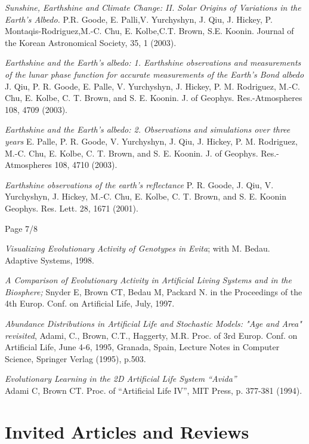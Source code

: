 \documentclass[margin,line]{resume}
\begin{document}
\begin{resume}
{\em Sunshine, Earthshine and Climate Change: II. Solar Origins of Variations in the Earth's Albedo.}  P.R. Goode, E. Palli,V. Yurchyshyn, J. Qiu,
 J. Hickey, P. Montaqis-Rodriguez,M.-C. Chu,
 E. Kolbe,C.T. Brown, S.E. Koonin.
Journal of the Korean Astronomical Society, 35, 1 (2003).

{\em Earthshine and the Earth's albedo: 1. Earthshine observations and measurements of the lunar phase function for accurate measurements of the Earth's Bond albedo}
J. Qiu, P. R. Goode, E. Palle, V. Yurchyshyn, J. Hickey, P. M. Rodriguez, M.-C. Chu, E. Kolbe, C. T. Brown, and S. E. Koonin.
J. of Geophys. Res.-Atmospheres 108, 4709 (2003).

{\em Earthshine and the Earth's albedo: 2. Observations and simulations over three years}
 E. Palle, P. R. Goode, V. Yurchyshyn, J. Qiu, J. Hickey, P. M. Rodriguez, M.-C. Chu, E. Kolbe, C. T. Brown, and S. E. Koonin.
J. of Geophys. Res.-Atmospheres 108, 4710 (2003).


{\em Earthshine observations of the earth's reflectance}
P. R. Goode, J. Qiu, V. Yurchyshyn, J. Hickey, M.-C. Chu, E. Kolbe, C. T. Brown, and S. E. Koonin
Geophys. Res. Lett. 28, 1671 (2001).

\vspace{1cm}
{\centerline {Page 7/8}}

\newpage

{\em Visualizing Evolutionary Activity of Genotypes in Evita};
with M. Bedau.  Adaptive Systems, 1998.

{\em A Comparison of Evolutionary Activity in Artificial Living Systems and in the 
	Biosphere;} Snyder E, Brown CT, Bedau M, Packard N.
in the Proceedings of the 4th Europ. Conf. on 
Artificial Life, July, 1997.

{\em Abundance Distributions in Artificial Life and Stochastic Models: "Age and
Area" revisited}, Adami, C., Brown, C.T., Haggerty, M.R.
Proc. of 3rd Europ. Conf. on Artificial Life, June 4-6, 1995,
Granada, Spain, Lecture Notes in Computer Science, Springer Verlag (1995),
p.503.

{\em Evolutionary Learning in the 2D Artificial Life System ``Avida''}\\
Adami C, Brown CT. Proc. of ``Artificial Life IV'', MIT Press, p. 377-381
(1994).

\section{\mysidestyle Invited Articles and Reviews}


\end{resume}
\end{document}
